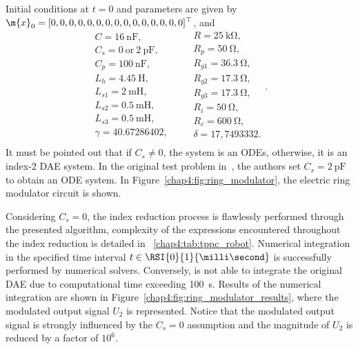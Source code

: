 %
Initial conditions at $t = 0$ and parameters are given by $\m{x}_0 = [0, 0, 0, 0, 0, 0, 0, 0, 0, 0, 0, 0, 0, 0, 0]^\top$, and
%
\begin{equation*}
  \begin{array}{l}
    C = \SI{16}{\nano\farad} \text{,} \\
    C_s = 0~\text{or}~\SI{2}{\pico\farad} \text{,} \\
    C_p = \SI{100}{\nano\farad} \text{,} \\
    L_h = \SI{4.45}{\henry} \text{,} \\
    L_{s1} = \SI{2}{\milli\henry} \text{,} \\
    L_{s2} = \SI{0.5}{\milli\henry} \text{,} \\
    L_{s3} = \SI{0.5}{\milli\henry} \text{,} \\
    \gamma = 40.67286402 \text{,} \\
  \end{array}
  \qquad
  \begin{array}{l}
    R = \SI{25}{\kilo\ohm} \text{,} \\
    R_p = \SI{50}{\ohm} \text{,} \\
    R_{g1} = \SI{36.3}{\ohm} \text{,} \\
    R_{g2} = \SI{17.3}{\ohm} \text{,} \\
    R_{g3} = \SI{17.3}{\ohm} \text{,} \\
    R_{i} = \SI{50}{\ohm} \text{,} \\
    R_{c} = \SI{600}{\ohm} \text{,} \\
    \delta = 17,7493332 \text{.} \\
  \end{array} \text{.}
\end{equation*}
%
It must be pointed out that if $C_s \neq 0$, the system is an \acp{ODE}, otherwise, it is an index-2 \ac{DAE} system. In the original test problem in~\cite{lioen1998test, mazzia2008test}, the authors set $C_s = \SI{2}{\pico\farad}$ to obtain an \ac{ODE} system. In Figure~\ref{chap4:fig:ring_modulator}, the electric ring modulator circuit is shown.

Considering $C_s = 0$, the index reduction process is flawlessly performed through the presented algorithm, complexity of the expressions encountered throughout the index reduction is detailed in \tablename{}~\ref{chap4:tab:tppc_robot}. Numerical integration in the specified time interval $t \in \RSI{0}{1}{\milli\second}$ is successfully performed by \Indigo{} numerical solvers. Conversely, \Maple{} is not able to integrate the original \ac{DAE} due to computational time exceeding \SI{100}{\second}. Results of the numerical integration are shown in Figure~\ref{chap4:fig:ring_modulator_results}, where the modulated output signal $U_2$ is represented. Notice that the modulated output signal is strongly influenced by the $C_s = 0$ assumption and the magnitude of $U_2$ is reduced by a factor of $10^6$.

